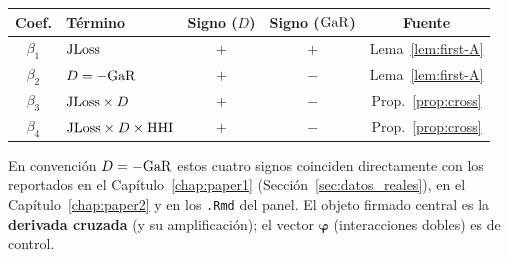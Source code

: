 \begin{center}
\begin{tabular}{clccc}
\toprule
Coef. & Término & Signo ($D$) & Signo ($\mathrm{GaR}$) & Fuente \\
\midrule
$\beta_1$ & $\mathrm{JLoss}$ & $+$ & $+$ & Lema~\ref{lem:first-A} \\
$\beta_2$ & $D=-\mathrm{GaR}$ & $+$ & $-$ & Lema~\ref{lem:first-A} \\
$\beta_3$ & $\mathrm{JLoss}\times D$ & $+$ & $-$ & Prop.~\ref{prop:cross} \\
$\beta_4$ & $\mathrm{JLoss}\times D\times\mathrm{HHI}$ & $+$ & $-$ & Prop.~\ref{prop:cross} \\
\bottomrule
\end{tabular}
\end{center}

\begin{remark}
En convención $D=-\mathrm{GaR}$ estos cuatro signos coinciden directamente con los reportados en el Capítulo~\ref{chap:paper1} (Sección~\ref{sec:datos_reales}), en el Capítulo~\ref{chap:paper2} y en los \texttt{.Rmd} del panel. El objeto firmado central es la \textbf{derivada cruzada} (y su amplificación); el vector $\boldsymbol\varphi$ (interacciones dobles) es de control.
\end{remark}
